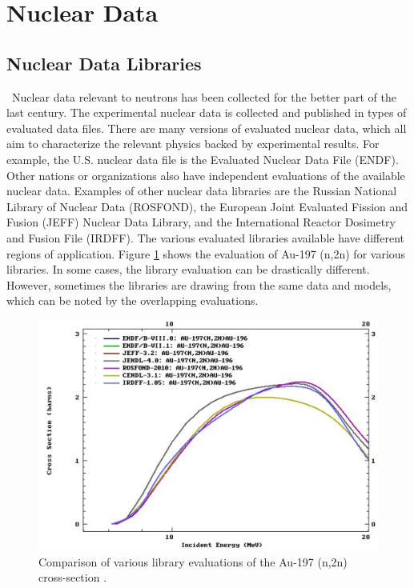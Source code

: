\section{Nuclear Data}

\subsection{Nuclear Data Libraries}

\ Nuclear data relevant to neutrons has been collected for the better part of the last century. 
The experimental nuclear data is collected and published in types of evaluated data files. 
There are many versions of evaluated nuclear data, which all aim to characterize the relevant physics backed by experimental results. 
For example, the U.S. nuclear data file is the Evaluated Nuclear Data File (ENDF). 
Other nations or organizations also have independent evaluations of the available nuclear data. 
Examples of other nuclear data libraries are the Russian National Library of Nuclear Data (ROSFOND), the European Joint Evaluated Fission and Fusion (JEFF) Nuclear Data Library, and the International Reactor Dosimetry and Fusion File (IRDFF).
The various evaluated libraries available have different regions of application. 
Figure \ref{fig:RxnComp} shows the evaluation of Au-197 (n,2n) for various libraries. 
In some cases, the library evaluation can be drastically different. 
However, sometimes the libraries are drawing from the same data and models, which can be noted by the overlapping evaluations. 

\begin{figure}[ht]
	\includegraphics[width=\linewidth]{Figures/Chapter2/RxnComp.png}
	\caption[Comparison of various library evaluations of the Au-197 (n,2n) cross-section.]{Comparison of various library evaluations of the Au-197 (n,2n) cross-section \cite{ENDF}.}
	\label{fig:RxnComp}
\end{figure}

